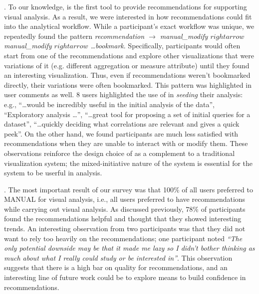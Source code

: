 . 
To our knowledge, \SeeDB is the first tool to provide recommendations for supporting visual
analysis.
As a result, we were interested in how recommendations could fit into the analytical workflow.
While a participant's exact workflow was unique, we repeatedly found the pattern {\em recommendation 
$\rightarrow$ manual\_modify $rightarrow$ manual\_modify $rightarrow$ \ldots bookmark}.
Specifically, participants would often start from one of the recommendations and explore other
visualizations that were variations of it (e.g. different aggregation or measure attribute) 
until they found an interesting visualization.
Thus, even if recommendations weren't bookmarked directly, their variations were often bookmarked.
This pattern was highlighted in user comments as well. 
8 users highlighted the use of \SeeDB in {\em seeding} their analysis: e.g.,
``\ldots would be incredibly useful in the initial analysis of the data'', 
``Exploratory analysis \ldots'',
``\ldots great tool for proposing a set of initial queries for a dataset'',
``\ldots quickly deciding what correlations are relevant and gives a quick peek''.
On the other hand, we found participants are much less satisfied with recommendations when they 
are unable to interact with or modify them.
These observations reinforce the design choice of \SeeDB as a complement to a traditional
visualization system; the mixed-initiative nature of the system is essential for the system to be
userful in analysis.

. 
The most important result of our survey was that 100\% of all users preferred \SeeDB to MANUAL for
visual analysis, i.e., all users preferred to have recommendations while carrying out visual analysis.
As discussed previously, 78\% of participants found the recommendations helpful and thought that they
showed interesting trends.
An interesting observation from two participants was that they did not want to rely too heavily
on the recommendations; one participant noted {\em ``The only potential downside may be that it made 
me lazy so I didn't bother thinking as much about what I really could study or be interested in''}.
This observation suggests that there is a high bar on quality for recommendations, and an interesting
line of future work could be to explore means to build confidence in recommendations.



